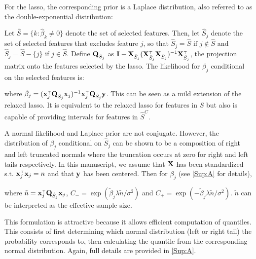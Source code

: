 For the lasso, the corresponding prior is a Laplace distribution, also referred to as the double-exponential distribution:

Let $\hat{S} = \lbrace k: \hat{\beta}_k \neq  0 \rbrace$ denote the set of selected features. Then, let $\hat{S}_j$ denote the set of selected features that excludes feature $j$, so that $\hat{S}_j = \hat{S} \text{ if } j \notin \hat{S}$ and $\hat{S}_j = \hat{S} - \lbrace j \rbrace \text{ if } j \in \hat{S}$. Define $\mathbf{Q}_{\hat{S}_j}$ as $\mathbf{I} - \mathbf{X}_{\hat{S}_j}(\mathbf{X}_{\hat{S}_j} ^{\scriptscriptstyle\top} \mathbf{X}_{\hat{S}_j})^{-1} \mathbf{X}_{\hat{S}_j} ^{\scriptscriptstyle\top}$, the projection matrix onto the features selected by the lasso. The likelihood for $\beta_j$ conditional on the selected features is:


\noindent where $\tilde{\beta}_j = (\mathbf{x}_j ^{\scriptscriptstyle\top} \mathbf{Q}_{\hat{S}_j} \mathbf{x}_j)^{-1} \mathbf{x}_j ^{\scriptscriptstyle\top} \mathbf{Q}_{\hat{S}_j} \mathbf{y}$.  This can be seen as a mild extension of the relaxed lasso. It is equivalent to the relaxed lasso for features in $\hat{S}$ but also is capable of providing intervals for features in $\hat{S}^C$.

A normal likelihood and Laplace prior are not conjugate. However, the distribution of $\beta_j$ conditional on $\hat{S}_j $ can be shown to be a composition of right and left truncated normals where the truncation occurs at zero for right and left tails respectively. In this manuscript, we assume that $\mathbf{X}$ has been standardized s.t. $\mathbf{x}_j ^{\scriptscriptstyle\top}\mathbf{x}_j = n$ and that $\mathbf{y}$ has been centered. Then for $\beta_j$ (see \ref{Sup:A} for details),

where $\tilde{n} = \mathbf{x}_j ^{\scriptscriptstyle\top} \mathbf{Q}_{\hat{S}_j} \mathbf{x}_j$, $C_{-} = \exp(\tilde{\beta}_j \lambda \tilde{n}/\sigma^2)$ and $C_{+} = \exp(-\tilde{\beta}_j \lambda \tilde{n}/\sigma^2)$. $\tilde{n}$ can be interpreted as the effective sample size.

This formulation is attractive because it allows efficient computation of quantiles. This consists of first determining which normal distribution (left or right tail) the probability corresponds to, then calculating the quantile from the corresponding normal distribution. Again, full details are provided in \ref{Sup:A}.

